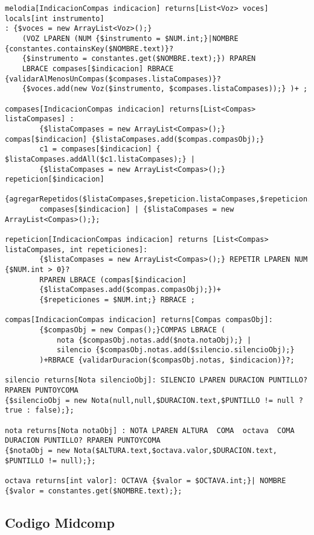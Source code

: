 \begin{verbatim}
melodia[IndicacionCompas indicacion] returns[List<Voz> voces] locals[int instrumento]
: {$voces = new ArrayList<Voz>();} 
	(VOZ LPAREN (NUM {$instrumento = $NUM.int;}|NOMBRE {constantes.containsKey($NOMBRE.text)}?
	{$instrumento = constantes.get($NOMBRE.text);}) RPAREN
	LBRACE compases[$indicacion] RBRACE {validarAlMenosUnCompas($compases.listaCompases)}?
	{$voces.add(new Voz($instrumento, $compases.listaCompases));} )+ ;

compases[IndicacionCompas indicacion] returns[List<Compas> listaCompases] : 
		{$listaCompases = new ArrayList<Compas>();} compas[$indicacion] {$listaCompases.add($compas.compasObj);}
		c1 = compases[$indicacion] { $listaCompases.addAll($c1.listaCompases);} | 
		{$listaCompases = new ArrayList<Compas>();} repeticion[$indicacion]
		{agregarRepetidos($listaCompases,$repeticion.listaCompases,$repeticion.repeticiones);}
		compases[$indicacion] | {$listaCompases = new ArrayList<Compas>();};

repeticion[IndicacionCompas indicacion] returns [List<Compas> listaCompases, int repeticiones]:
		{$listaCompases = new ArrayList<Compas>();} REPETIR LPAREN NUM {$NUM.int > 0}? 
		RPAREN LBRACE (compas[$indicacion] 
		{$listaCompases.add($compas.compasObj);})+
		{$repeticiones = $NUM.int;} RBRACE ;

compas[IndicacionCompas indicacion] returns[Compas compasObj]: 
		{$compasObj = new Compas();}COMPAS LBRACE (
			nota {$compasObj.notas.add($nota.notaObj);} |
			silencio {$compasObj.notas.add($silencio.silencioObj);}
		)+RBRACE {validarDuracion($compasObj.notas, $indicacion)}?;

silencio returns[Nota silencioObj]: SILENCIO LPAREN DURACION PUNTILLO? RPAREN PUNTOYCOMA 
{$silencioObj = new Nota(null,null,$DURACION.text,$PUNTILLO != null ? true : false);};

nota returns[Nota notaObj] : NOTA LPAREN ALTURA  COMA  octava  COMA DURACION PUNTILLO? RPAREN PUNTOYCOMA
{$notaObj = new Nota($ALTURA.text,$octava.valor,$DURACION.text, $PUNTILLO != null);};

octava returns[int valor]: OCTAVA {$valor = $OCTAVA.int;}| NOMBRE {$valor = constantes.get($NOMBRE.text);};

\end{verbatim}


\subsection{Codigo Midcomp}

